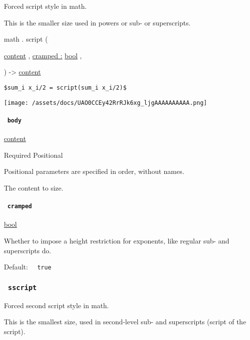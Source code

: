 Forced script style in math.

This is the smaller size used in powers or sub- or superscripts.

math { . } { script } (

{ \href{/docs/reference/foundations/content/}{content} , } {
\hyperref[functions-script-parameters-cramped]{cramped :}
\href{/docs/reference/foundations/bool/}{bool} , }

) -\textgreater{} \href{/docs/reference/foundations/content/}{content}

\begin{verbatim}
$sum_i x_i/2 = script(sum_i x_i/2)$
\end{verbatim}

\texttt{[image: /assets/docs/UAO0CCEy42RrRJk6xg\_ljgAAAAAAAAAA.png]}

\paragraph{\texorpdfstring{\texttt{\ body\ }}{ body }}\label{functions-script-body}

\href{/docs/reference/foundations/content/}{content}

{Required} {{ Positional }}

\label{functions-script-body-positional-tooltip}
Positional parameters are specified in order, without names.

The content to size.

\paragraph{\texorpdfstring{\texttt{\ cramped\ }}{ cramped }}\label{functions-script-cramped}

\href{/docs/reference/foundations/bool/}{bool}

Whether to impose a height restriction for exponents, like regular sub-
and superscripts do.

Default: \texttt{\ }{\texttt{\ true\ }}\texttt{\ }

\subsubsection{\texorpdfstring{\texttt{\ sscript\ }}{ sscript }}\label{functions-sscript}

Forced second script style in math.

This is the smallest size, used in second-level sub- and superscripts
(script of the script).

